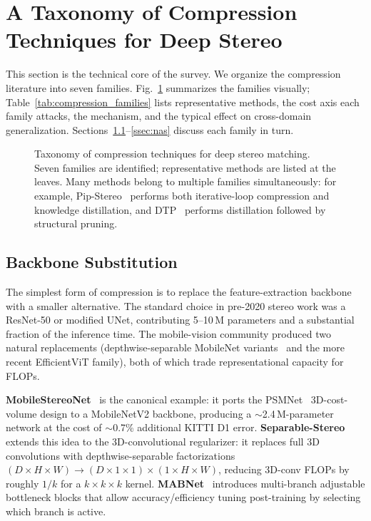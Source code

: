 \section{A Taxonomy of Compression Techniques for Deep Stereo}
\label{sec:taxonomy}

This section is the technical core of the survey. We organize the compression literature into seven families. Fig.~\ref{fig:taxonomy} summarizes the families visually; Table~\ref{tab:compression_families} lists representative methods, the cost axis each family attacks, the mechanism, and the typical effect on cross-domain generalization. Sections~\ref{ssec:backbone}--\ref{ssec:nas} discuss each family in turn.

\begin{figure}[!htbp]
\centering

\caption{Taxonomy of compression techniques for deep stereo matching. Seven families are identified; representative methods are listed at the leaves. Many methods belong to multiple families simultaneously: for example, Pip-Stereo~\cite{zheng2026pipstereo} performs both iterative-loop compression and knowledge distillation, and DTP~\cite{pan2024dtp} performs distillation followed by structural pruning.}
\label{fig:taxonomy}
\end{figure}



\subsection{Backbone Substitution}
\label{ssec:backbone}

The simplest form of compression is to replace the feature-extraction backbone with a smaller alternative. The standard choice in pre-2020 stereo work was a ResNet-50 or modified UNet, contributing 5--10\,M parameters and a substantial fraction of the inference time. The mobile-vision community produced two natural replacements (depthwise-separable MobileNet variants~\cite{shamsafar2022mobilestereonet} and the more recent EfficientViT family), both of which trade representational capacity for FLOPs.

\textbf{MobileStereoNet}~\cite{shamsafar2022mobilestereonet} is the canonical example: it ports the PSMNet~\cite{chang2018psmnet} 3D-cost-volume design to a MobileNetV2 backbone, producing a $\sim$2.4\,M-parameter network at the cost of $\sim$0.7\% additional KITTI D1 error. \textbf{Separable-Stereo}~\cite{rahim2021separable} extends this idea to the 3D-convolutional regularizer: it replaces full 3D convolutions with depthwise-separable factorizations $(D \times H \times W) \to (D \times 1 \times 1) \times (1 \times H \times W)$, reducing 3D-conv FLOPs by roughly $1/k$ for a $k \times k \times k$ kernel. \textbf{MABNet}~\cite{xing2020mabnet} introduces multi-branch adjustable bottleneck blocks that allow accuracy/efficiency tuning post-training by selecting which branch is active.

